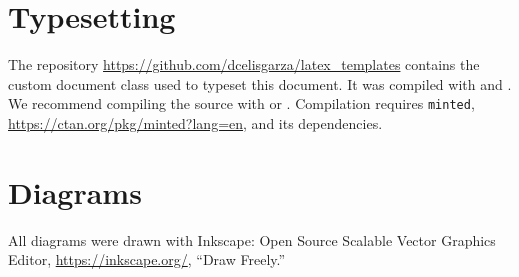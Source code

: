 \section{Typesetting}
\label{s:typeset}

The repository \href{https://github.com/dcelisgarza/latex_templates}{https://github.com/dcelisgarza/latex\_templates} contains the custom document class used to typeset this document. It was compiled with  and . We recommend compiling the source with  or . Compilation requires \texttt{minted}, \href{https://ctan.org/pkg/minted?lang=en}{https://ctan.org/pkg/minted?lang=en}, and its dependencies.
\section{Diagrams}
\label{s:diag}

All diagrams were drawn with Inkscape: Open Source Scalable Vector Graphics Editor, \href{https://inkscape.org/}{https://inkscape.org/}, ``Draw Freely.''
\savearabiccounter